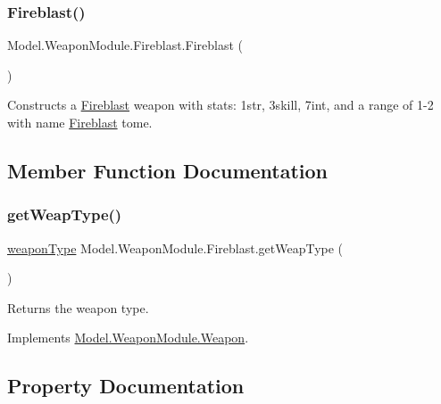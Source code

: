 \subsubsection{\texorpdfstring{Fireblast()}{Fireblast()}}
{\footnotesize\ttfamily Model.\+Weapon\+Module.\+Fireblast.\+Fireblast (\begin{DoxyParamCaption}{ }\end{DoxyParamCaption})\hspace{0.3cm}{\ttfamily [inline]}}

Constructs a \hyperlink{class_model_1_1_weapon_module_1_1_fireblast}{Fireblast} weapon with stats\+: 1str, 3skill, 7int, and a range of 1-\/2 with name \hyperlink{class_model_1_1_weapon_module_1_1_fireblast}{Fireblast} tome. 

\subsection{Member Function Documentation}
\hypertarget{class_model_1_1_weapon_module_1_1_fireblast_a90f93c7c190cf7e7d1b55b48b56face9}{}\label{class_model_1_1_weapon_module_1_1_fireblast_a90f93c7c190cf7e7d1b55b48b56face9} 
\subsubsection{\texorpdfstring{get\+Weap\+Type()}{getWeapType()}}
{\footnotesize\ttfamily \hyperlink{namespace_model_1_1_weapon_module_a3390c266f89e3399c2bc7fa31f13cbec}{weapon\+Type} Model.\+Weapon\+Module.\+Fireblast.\+get\+Weap\+Type (\begin{DoxyParamCaption}{ }\end{DoxyParamCaption})\hspace{0.3cm}{\ttfamily [inline]}}

Returns the weapon type. 

Implements \hyperlink{interface_model_1_1_weapon_module_1_1_weapon_a175133855ef446d3d87c70d13979be9c}{Model.\+Weapon\+Module.\+Weapon}.



\subsection{Property Documentation}
\hypertarget{class_model_1_1_weapon_module_1_1_fireblast_a1d136d30cb83e0d1d2c137cc3159a03a}{}\label{class_model_1_1_weapon_module_1_1_fireblast_a1d136d30cb83e0d1d2c137cc3159a03a} 
